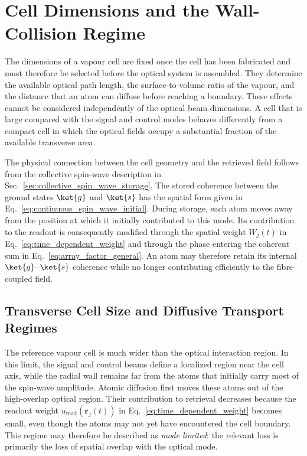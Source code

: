 \section{Cell Dimensions and the Wall-Collision Regime}
\label{sec:results_compact_cell_geometry}

The dimensions of a vapour cell are fixed once the cell has been fabricated and must therefore be selected before the optical system is assembled. They determine the available optical path length, the surface-to-volume ratio of the vapour, and the distance that an atom can diffuse before reaching a boundary. These effects cannot be considered independently of the optical beam dimensions. A cell that is large compared with the signal and control modes behaves differently from a compact cell in which the optical fields occupy a substantial fraction of the available transverse area.

The physical connection between the cell geometry and the retrieved field follows from the collective spin-wave description in Sec.~\ref{sec:collective_spin_wave_storage}. The stored coherence between the ground states $\ket{g}$ and $\ket{s}$ has the spatial form given in Eq.~\eqref{eq:continuous_spin_wave_initial}. During storage, each atom moves away from the position at which it initially contributed to this mode. Its contribution to the readout is consequently modified through the spatial weight $W_j(t)$ in Eq.~\eqref{eq:time_dependent_weight} and through the phase entering the coherent sum in Eq.~\eqref{eq:array_factor_general}. An atom may therefore retain its internal $\ket{g}$--$\ket{s}$ coherence while no longer contributing efficiently to the fibre-coupled field.

\subsection{Transverse Cell Size and Diffusive Transport Regimes}
\label{subsec:transverse_cell_size}

The reference vapour cell is much wider than the optical interaction region. In this limit, the signal and control beams define a localized region near the cell axis, while the radial wall remains far from the atoms that initially carry most of the spin-wave amplitude. Atomic diffusion first moves these atoms out of the high-overlap optical region. Their contribution to retrieval decreases because the readout weight $u_{\mathrm{read}}(\mathbf{r}_j(t))$ in Eq.~\eqref{eq:time_dependent_weight} becomes small, even though the atoms may not yet have encountered the cell boundary. This regime may therefore be described as \emph{mode limited}: the relevant loss is primarily the loss of spatial overlap with the optical mode.

